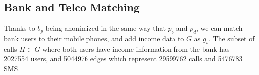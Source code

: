 \subsection{Bank and Telco Matching}

Thanks to \( b_p \) being anonimized in the same way that \( p_o \) and \( p_d \), we can match bank users to their mobile phones, and add income data to \( G \) as \( g_s \). The subset of calls \( H \subset G \) where both users have income information from the bank has \num{2027554} users, and \num{5044976} edges which represent \num{29599762} calls and \num{5476783} SMS.